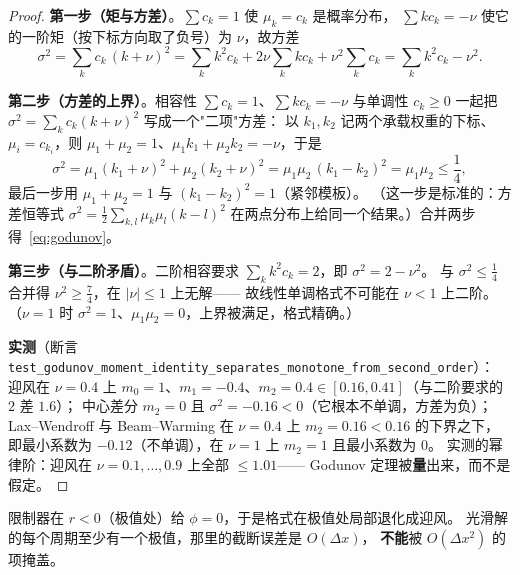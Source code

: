 \begin{proof}
\textbf{第一步（矩与方差）}。$\sum c_k=1$ 使 $\mu_k=c_k$ 是概率分布，
$\sum kc_k=-\nu$ 使它的一阶矩（按下标方向取了负号）为 $\nu$，故方差
\begin{equation}
  \sigma^2=\sum_kc_k\,(k+\nu)^2=\sum_kk^2c_k+2\nu\sum_kkc_k+\nu^2\sum_kc_k
  =\sum_kk^2c_k-\nu^2 .
\end{equation}

\textbf{第二步（方差的上界）}。相容性 $\sum c_k=1$、$\sum kc_k=-\nu$ 与单调性 $c_k\ge0$
一起把 $\sigma^2=\sum_k c_k(k+\nu)^2$ 写成一个"二项"方差：
以 $k_1,k_2$ 记两个承载权重的下标、$\mu_i=c_{k_i}$，则
$\mu_1+\mu_2=1$、$\mu_1k_1+\mu_2k_2=-\nu$，于是
\begin{equation}
  \sigma^2=\mu_1(k_1+\nu)^2+\mu_2(k_2+\nu)^2
  =\mu_1\mu_2\,(k_1-k_2)^2=\mu_1\mu_2\le\frac14 ,
\end{equation}
最后一步用 $\mu_1+\mu_2=1$ 与 $(k_1-k_2)^2=1$（紧邻模板）。
（这一步是标准的：方差恒等式 $\sigma^2=\tfrac12\sum_{k,l}\mu_k\mu_l(k-l)^2$
在两点分布上给同一个结果。）合并两步得~\eqref{eq:godunov}。

\textbf{第三步（与二阶矛盾）}。二阶相容要求 $\sum_kk^2c_k=2$，即 $\sigma^2=2-\nu^2$。
与 $\sigma^2\le\tfrac14$ 合并得 $\nu^2\ge\tfrac74$，在 $|\nu|\le1$ 上无解——
故线性单调格式不可能在 $\nu<1$ 上二阶。
（$\nu=1$ 时 $\sigma^2=1$、$\mu_1\mu_2=0$，上界被满足，格式精确。）

\textbf{实测}（断言 \texttt{test\_godunov\_moment\_identity\_separates\_monotone\_from\_second\_order}）：
迎风在 $\nu=0.4$ 上 $m_0=1$、$m_1=-0.4$、$m_2=0.4\in[0.16,0.41]$（与二阶要求的 $2$ 差 $1.6$）；
中心差分 $m_2=0$ 且 $\sigma^2=-0.16<0$（它根本不单调，方差为负）；
Lax--Wendroff 与 Beam--Warming 在 $\nu=0.4$ 上 $m_2=0.16<0.16$ 的下界之下，
即最小系数为 $-0.12$（不单调），在 $\nu=1$ 上 $m_2=1$ 且最小系数为 $0$。
实测的幂律阶：迎风在 $\nu=0.1,\dots,0.9$ 上全部 $\le1.01$——
Godunov 定理被\textbf{量}出来，而不是假定。
\end{proof}

\begin{corollary}[限制器必须降阶]
\label{cor:degrade}
限制器在 $r<0$（极值处）给 $\phi=0$，于是格式在极值处局部退化成迎风。
光滑解的每个周期至少有一个极值，那里的截断误差是 $O(\Delta x)$，
\textbf{不能}被 $O(\Delta x^2)$ 的项掩盖。
\end{corollary}

